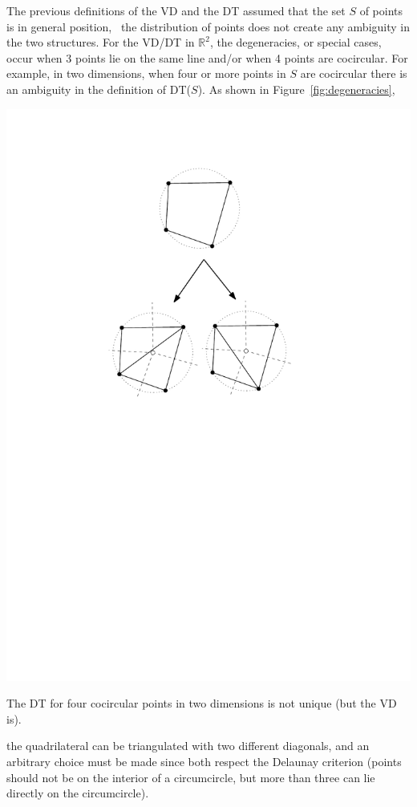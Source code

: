 The previous definitions of the VD and the DT assumed that the set $S$ of points is in general position, \ie\ the distribution of points does not create any ambiguity in the two structures. 
For the VD/DT in $\mathbb{R}^{2}$, the degeneracies, or special cases, occur when 3 points lie on the same line and/or when 4 points are cocircular. 
For example, in two dimensions, when four or more points in $S$ are cocircular there is an ambiguity in the definition of DT($S$). 
As shown in Figure~\ref{fig:degeneracies},
\begin{marginfigure}
  \centering
  \includegraphics[width=\textwidth]{degeneracies}
  \caption{The DT for four cocircular points in two dimensions is not unique (but the VD is).}%
\label{fig:degeneracies}
\end{marginfigure}
the quadrilateral can be triangulated with two different diagonals, and an arbitrary choice must be made since both respect the Delaunay criterion (points should not be on the interior of a circumcircle, but more than three can lie directly on the circumcircle).

